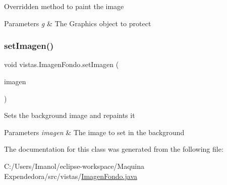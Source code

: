 Overridden method to paint the image 
\begin{DoxyParams}{Parameters}
{\em g} & The Graphics object to protect \\
\hline
\end{DoxyParams}
\mbox{\label{classvistas_1_1_imagen_fondo_a005d3ae967e1ff7f995d6d50d7c1d17f}} 
\subsubsection{\texorpdfstring{set\+Imagen()}{setImagen()}}
{\footnotesize\ttfamily void vistas.\+Imagen\+Fondo.\+set\+Imagen (\begin{DoxyParamCaption}\item[{Buffered\+Image}]{imagen }\end{DoxyParamCaption})}

Sets the background image and repaints it 
\begin{DoxyParams}{Parameters}
{\em imagen} & The image to set in the background \\
\hline
\end{DoxyParams}


The documentation for this class was generated from the following file\+:\begin{DoxyCompactItemize}
\item 
C\+:/\+Users/\+Imanol/eclipse-\/workspace/\+Maquina Expendedora/src/vistas/\mbox{\hyperlink{_imagen_fondo_8java}{Imagen\+Fondo.\+java}}\end{DoxyCompactItemize}
